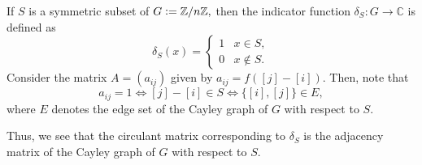 \documentclass[12pt]{article}	%
\begin{document}
\begin{ex}
    If $S$ is a symmetric subset of $G \vcentcolon= \mathbb{Z}/n\mathbb{Z},$ then the indicator function $\delta_S : G \to \mathbb{C}$ is defined as
    \begin{equation*} 
        \delta_S(x) = \begin{cases}
            1 & x \in S,\\
            0 & x \notin S. 
        \end{cases}
    \end{equation*} 
    Consider the matrix $A = (a_{ij})$ given by $a_{ij} = f([j] - [i]).$ Then, note that 
    \begin{equation*} 
        a_{ij} = 1 \iff [j] - [i] \in S \iff \{[i], [j]\} \in E,
    \end{equation*}
    where $E$ denotes the edge set of the Cayley graph of $G$ with respect to $S.$

    Thus, we see that the circulant matrix corresponding to $\delta_S$ is the adjacency matrix of the Cayley graph of $G$ with respect to $S.$
\end{ex}
\end{document}

